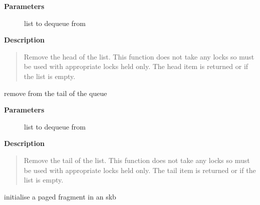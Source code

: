 \documentclass[a4paper,8pt,english]{sphinxmanual}
\begin{document}
\textbf{Parameters}
\begin{description}
\item[{}] \leavevmode
list to dequeue from

\end{description}

\textbf{Description}
\begin{quote}

Remove the head of the list. This function does not take any locks
so must be used with appropriate locks held only. The head item is
returned or  if the list is empty.
\end{quote}

\begin{fulllineitems}
\label{networking/kapi:c.skb_dequeue_tail}
remove from the tail of the queue

\end{fulllineitems}


\textbf{Parameters}
\begin{description}
\item[{}] \leavevmode
list to dequeue from

\end{description}

\textbf{Description}
\begin{quote}

Remove the tail of the list. This function does not take any locks
so must be used with appropriate locks held only. The tail item is
returned or  if the list is empty.
\end{quote}

\begin{fulllineitems}
\label{networking/kapi:c.__skb_fill_page_desc}
initialise a paged fragment in an skb

\end{fulllineitems}
\end{document}
